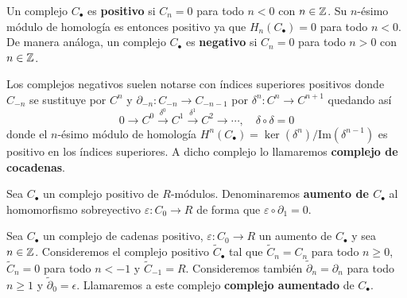 \begin{definicion}
	Un complejo \(C_{\bullet}\) es \textbf{positivo} si \(C_{n} = 0\) para todo
	\(n < 0\) con \(n \in \mathbb{Z}\). Su \(n\)-ésimo módulo de homología es entonces positivo ya
	que \(H_{n}(C_{\bullet}) = 0\) para todo \(n < 0\). De manera análoga, un complejo
	\(C_{\bullet}\) es \textbf{negativo} si \(C_{n} = 0\) para todo \(n > 0\) con
	\(n \in \mathbb{Z}\).
\end{definicion}

Los complejos negativos suelen notarse con índices superiores positivos donde \(C_{-n}\)
se sustituye por \(C^{n}\) y \(\partial_{-n}: C_{-n}\rightarrow C_{-n-1}\) por \(\delta
^{n}: C^{n} \rightarrow C^{n+1}\) quedando así
\[
	0 \to C^{0} \xrightarrow{\delta^0}C^{1} \xrightarrow{\delta^1}C^{2} \to \cdots,
	\quad \delta \circ \delta = 0
\]
donde el \(n\)-ésimo módulo de homología \(H^{n}(C_{\bullet}) = \ker(\delta^{n})/\text{Im}
(\delta^{n-1})\) es positivo en los índices superiores. A dicho complejo lo
llamaremos \textbf{complejo de cocadenas}.

\begin{definicion}
	Sea \(C_{\bullet}\) un complejo positivo de \(R\)-módulos. Denominaremos \textbf{aumento
	de \(C_{\bullet}\)} al homomorfismo sobreyectivo \(\varepsilon : C_{0} \to R\) de forma
	que \(\varepsilon \circ \partial_{1} = 0\).
\end{definicion}

\begin{definicion}
	Sea \(C_{\bullet}\) un complejo de cadenas positivo, \(\varepsilon : C_{0} \to R\)
	un aumento de \(C_{\bullet}\) y sea \(n \in \mathbb{Z}\). Consideremos el complejo positivo
	\(\widetilde{C}_{\bullet}\) tal que \(\widetilde{C}_{n} = C_{n}\) para todo \(n \geq
	0\), \(\widetilde{C}_{n} = 0\) para todo \(n < -1\) y \(\widetilde{C}_{-1}=R\). Consideremos
	también \(\widetilde{\partial}_{n} = \partial_{n}\) para todo \(n \geq 1\) y \(\widetilde
	{\partial}_{0}= \epsilon\). Llamaremos a este complejo \textbf{complejo
	aumentado} de \(C_{\bullet}\).
\end{definicion}
%

